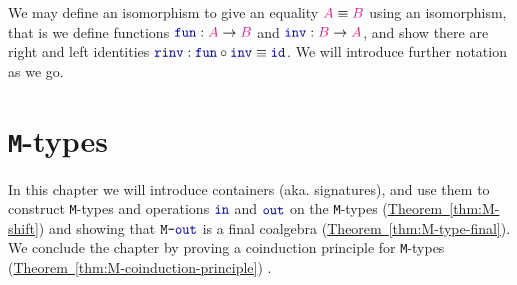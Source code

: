 \documentclass[twoside,11pt,openright]{report}
\theoremstyle{plain} %
\theoremstyle{definition}
\theoremstyle{remark}
\newcommand*{\thmref}[1]{\hyperref[thm:#1]{Theorem~\ref*{thm:#1}}} %
\newcommand*{\type}[1]{\textcolor{magenta!90!black}{#1}}
\newcommand*{\coalg}[2]{#1\texttt{-}#2}
\newcommand*{\function}[1]{\textcolor{blue!60!black}{\ensuremath{\mathtt{#1}}}}
\newcommand*{\typeformer}[1]{\ensuremath{\mathtt{#1}}}
\begin{document}
We may define an isomorphism to give an equality \(\type{A} \equiv \type{B}\) using an isomorphism, that is we define functions \(\function{fun} : \type{A} \rightarrow \type{B}\) and \(\function{inv} : \type{B} \rightarrow \type{A}\), and show there are right and left identities \(\function{rinv} : \function{fun} \circ \function{inv} \equiv \function{id}\).
\noindent We will introduce further notation as we go.


\chapter{\texttt{M}-types}
\label{ch:M-types}
In this chapter we will introduce containers (aka. signatures), and use them to construct \texttt{M}-types and operations \(\function{in}\) and \(\function{out}\) on the \texttt{M}-types (\thmref{M-shift}) and showing that \(\coalg{\typeformer{M}}{\function{out}}\) is a final coalgebra (\thmref{M-type-final}). We conclude the chapter by proving a coinduction principle for \texttt{M}-types (\thmref{M-coinduction-principle}) \cite{DBLP:non-wellfounded}.
\end{document}
